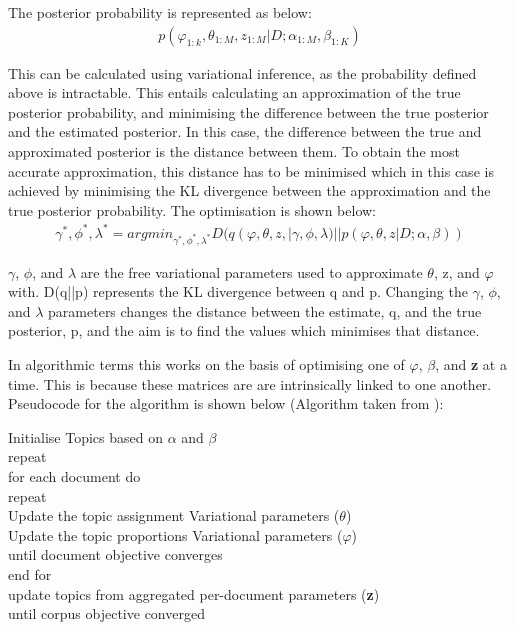The posterior probability is represented as below:
\begin{align*}
	p(\varphi_{1:k}, \theta_{1:M}, z_{1:M} | D; \alpha_{1:M}, \beta_{1:K})
\end{align*}

This can be calculated using variational inference, as the probability defined above is intractable. This entails calculating an approximation of the true posterior probability, and minimising the difference between the true posterior and the estimated posterior. In this case, the difference between the true and approximated posterior is the distance between them. To obtain the most accurate approximation, this distance has to be minimised which in this case is achieved by minimising the KL divergence between the approximation and the true posterior probability. The optimisation is shown below:
\begin{align*}
	\gamma^{*}, \phi^{*}, \lambda^{*} = argmin_{\gamma^{*}, \phi^{*}, \lambda^{*}} D(q(\varphi, \theta, z, | \gamma, \phi, \lambda) ||p(\varphi, \theta, z | D; \alpha, \beta))
\end{align*}


$\gamma$, $\phi$, and $\lambda$ are the free variational parameters used to approximate $\theta$, z, and $\varphi$ with. D(q||p) represents the KL divergence between q and p. Changing the $\gamma$, $\phi$, and $\lambda$ parameters changes the distance between the estimate, q, and the true posterior, p, and the aim is to find the values which minimises that distance.

In algorithmic terms this works on the basis of optimising one of $\varphi$, $\beta$, and \textbf{z} at a time. This is because these matrices are are intrinsically linked to one another. Pseudocode for the algorithm is shown below (Algorithm taken from \cite{ldaalgorithm}):
\begin{algorithm}
	\begin{algorithmic}
	\STATE Initialise Topics based on $\alpha$ and $\beta$\\
	repeat\\ 
	\hspace{1cm} for each document do\\
			\hspace{2cm} repeat\\ 
				\hspace{3cm}Update the topic assignment Variational parameters ($\theta$)\\
				\hspace{3cm}Update the topic proportions Variational parameters ($\varphi$)\\
			\hspace{2cm}until document objective converges\\
		\hspace{1cm}end for\\ 
		\hspace{1cm}update topics from aggregated per-document parameters (\textbf{z})\\
	until corpus objective converged\\
		\end{algorithmic}
\end{algorithm}

